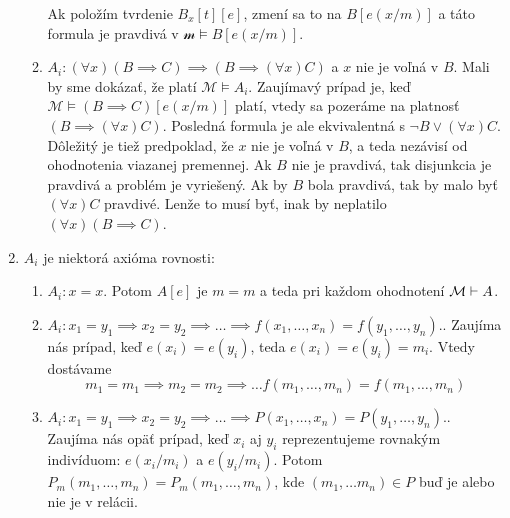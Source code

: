 \begin{dokaz}
\begin{enumerate}
\begin{enumerate}
            Ak položím tvrdenie $B_x[t][e]$, zmení sa to na $B[e(x/m)]$ a
            táto formula je pravdivá v $\mathcal{m} \models B[e(x/m)]$.

        \item $A_i: (\forall x) (B \implies C) \implies (B \implies
            (\forall x) C)$ a $x$ nie je voľná v $B$.
            Mali by sme dokázať, že platí $\mathcal{M} \models A_i$.
            Zaujímavý prípad je, keď
            $\mathcal{M} \models (B \implies C)[e(x/m)]$ platí, vtedy sa
            pozeráme na platnosť $(B \implies (\forall x)C)$.
            Posledná formula je ale ekvivalentná s $\neg B \lor (\forall x) C$.
            Dôležitý je tiež predpoklad, že $x$ nie je voľná v $B$,
            a teda nezávisí od ohodnotenia viazanej premennej.
            Ak $B$ nie je pravdivá, tak disjunkcia je pravdivá a
            problém je vyriešený.
            Ak by $B$ bola pravdivá, tak by malo byť $(\forall x) C$
            pravdivé. Lenže to musí byť, inak by neplatilo
            $(\forall x) (B \implies C)$.
    \end{enumerate}

    \item $A_i$ je niektorá axióma rovnosti:
    \begin{enumerate}
        \item $A_i: x=x$. Potom $A[e]$ je $m=m$ a teda pri každom
            ohodnotení $\mathcal{M} \vdash A$.

        \item $A_i: x_1 = y_1 \implies x_2 = y_2 \implies \ldots 
            \implies f(x_1, \ldots, x_n) = f(y_1, \ldots, y_n).$.
            Zaujíma nás prípad, keď  $e(x_i) = e(y_i)$, teda
            $e(x_i)=e(y_i)=m_i$. Vtedy dostávame
            \begin{equation*}
              m_1=m_1 \implies m_2=m_2 \implies \ldots
                f(m_1, \dots, m_n) =f(m_1, \dots, m_n)
            \end{equation*}

        \item $A_i: x_1 = y_1 \implies x_2 = y_2 \implies \ldots 
            \implies P(x_1, \ldots, x_n) = P(y_1, \ldots, y_n).$.
            Zaujíma nás opäť prípad, keď $x_i$ aj $y_i$ reprezentujeme 
            rovnakým indivíduom: $e(x_i/m_i)$ a $e(y_i/m_i)$.
            Potom
            $P_m(m_1, \ldots, m_n) = P_m(m_1, \ldots, m_n)$, kde $(m_1,
        \ldots m_n) \in P$ buď je alebo nie je v relácii.
    \end{enumerate}


\end{enumerate}
\end{dokaz}
